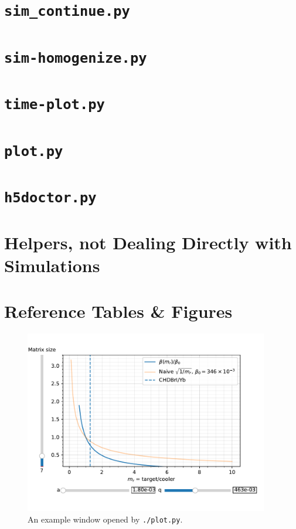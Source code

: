 \section{\texttt{sim\_continue.py}}\label{ssec:sim_continue}


\section{\texttt{sim-homogenize.py}}

\section{\texttt{time-plot.py}}

\section{\texttt{plot.py}}

\section{\texttt{h5doctor.py}}

\section{Helpers, not Dealing Directly with Simulations}

\section{Reference Tables \& Figures}

\begin{figure}[h]
	\begin{center}
		\includegraphics[width=0.95\textwidth]{graphics/software-plot-example.pdf}
	\end{center}
	\caption{An example window opened by \texttt{./plot.py}.}
	\label{fig:software-plot-example}
\end{figure}

